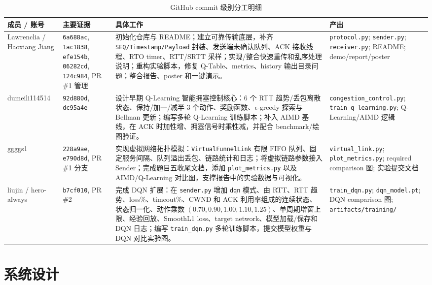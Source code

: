 \documentclass[a4paper, 11pt]{article}
\begin{document}
\begin{table}[H]
\centering
\caption{GitHub commit 级别分工明细}
\scriptsize
\begin{tabularx}{\textwidth}{>{\raggedright\arraybackslash}p{2.05cm} >{\raggedright\arraybackslash}p{2.45cm} X >{\raggedright\arraybackslash}p{3.15cm}}
\toprule
\textbf{成员 / 账号} & \textbf{主要证据} & \textbf{具体工作} & \textbf{产出} \\
\midrule
Lawrenclia / Haoxiang Jiang & \texttt{6a688ac}, \texttt{1ac1838}, \texttt{efe154b}, \texttt{06282cd}, \texttt{124c984}, PR \#1 管理 & 初始化仓库与 README；建立可靠传输底层，补齐 \texttt{SEQ/Timestamp/Payload} 封装、发送端未确认队列、ACK 接收线程、RTO timer、RTT/SRTT 采样；实现/整合快速重传和乱序处理说明；重构实验脚本，修复 Q-Table、metrics、history 输出目录问题；整合报告、poster 和一键演示。 & \texttt{protocol.py}; \texttt{sender.py}; \texttt{receiver.py}; README; demo/report/poster \\
dumeili114514 & \texttt{92d880d}, \texttt{dc95a4e} & 设计早期 Q-Learning 智能拥塞控制核心：6 个 RTT 趋势/丢包离散状态、保持/加一/减半 3 个动作、奖励函数、\(\epsilon\)-greedy 探索与 Bellman 更新；编写多轮 Q-Learning 训练脚本；补入 AIMD 基线，在 ACK 时加性增、拥塞信号时乘性减，并配合 benchmark/绘图验证。 & \texttt{congestion\_control.py}; \texttt{train\_q\_learning.py}; Q-Learning/AIMD 逻辑 \\
ggggs1 & \texttt{228a9ae}, \texttt{e790d8d}, PR \#1 分支 & 实现虚拟网络拓扑模拟：\texttt{VirtualFunnelLink} 有限 FIFO 队列、固定服务间隔、队列溢出丢包、链路统计和日志；将虚拟链路参数接入 Sender；完成题目五收尾文档，添加 \texttt{plot\_metrics.py} 以及 AIMD/Q-Learning 对比图，支撑报告中的实验数据与可视化。 & \texttt{virtual\_link.py}; \texttt{plot\_metrics.py}; required comparison 图; 实验提交文档 \\
liujin / hero-always & \texttt{b7cf010}, PR \#2 & 完成 DQN 扩展：在 \texttt{sender.py} 增加 \texttt{dqn} 模式、由 RTT、RTT 趋势、loss\%、timeout\%、CWND 和 ACK 利用率组成的连续状态、状态归一化、动作乘数 \((0.70,0.90,1.00,1.10,1.25)\)、单周期增窗上限、经验回放、SmoothL1 loss、target network、模型加载/保存和 DQN 日志；编写 \texttt{train\_dqn.py} 多轮训练脚本，提交模型权重与 DQN 对比实验图。 & \texttt{train\_dqn.py}; \texttt{dqn\_model.pt}; DQN comparison 图; \texttt{artifacts/training/} \\
\bottomrule
\end{tabularx}
\end{table}

\section{系统设计}
\end{document}
